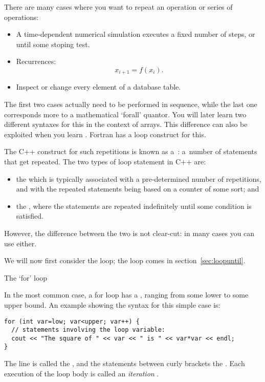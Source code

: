 
There are many cases where you want to repeat an operation or series
of operations:
\begin{itemize}
\item A time-dependent numerical simulation executes a fixed number of
  steps, or until some stoping test.
\item Recurrences: \[ x_{i+1} = f(x_i). \]
\item Inspect or change every element of a database table.
\end{itemize}

The first two cases actually need to be performed in sequence, while
the last one corresponds more to a mathematical `forall' quantor. You
will later learn two different syntaxes for this in the context of arrays.
This
difference can also be exploited when you learn
. Fortran has a
 loop construct for this.

The C++ construct for such repetitions
is known as a~: a~number of
statements that get repeated. The two types of loop statement in C++ are:
\begin{itemize}
\item the  which is typically associated with
  a pre-determined number of repetitions, and with the repeated
  statements being based on a counter of some sort; and
\item the , where the statements are
  repeated indefinitely until some condition is satisfied.
\end{itemize}
However, the difference between the two is not clear-cut: in many
cases you can use either.

We will now first consider the  loop; the  loop comes in
section~\ref{sec:loopuntil}.

 {The `for' loop}
\label{sec:for}

In the most common case, a for loop has a
, ranging from some lower to some upper
bound. An example showing the syntax for this simple case is:
\begin{verbatim}
for (int var=low; var<upper; var++) {
  // statements involving the loop variable:
  cout << "The square of " << var << " is " << var*var << endl;
}
\end{verbatim}
The  line is called the , and the
statements between curly brackets the .
Each execution of the loop body is called an
%
\emph{iteration}%
%
%
.

